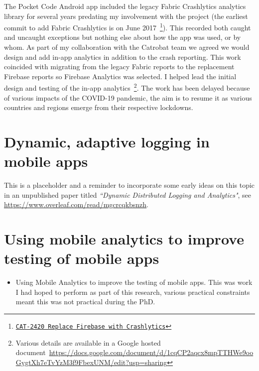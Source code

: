 The Pocket Code Android app included the legacy Fabric Crashlytics analytics library for several years predating my involvement with the project (the earliest commit to add Fabric Crashlytics is on  June 2017~\footnote{\href{https://github.com/Catrobat/Catroid/commit/95aa37ff5263402b41b63f50296aabc8c354433e}{\texttt{CAT-2420 Replace Firebase with Crashlytics}}}). This recorded both caught and uncaught exceptions but nothing else about how the app was used, or by whom. As part of my collaboration with the Catrobat team we agreed we would design and add in-app analytics in addition to the crash reporting. This work coincided with migrating from the legacy Fabric reports to the replacement Firebase reports so Firebase Analytics was selected. I helped lead the initial design and testing of the in-app analytics~\footnote{Various details are available in a Google hosted document~\url{https://docs.google.com/document/d/1cqCP2aqcx8mpTTHWe9ooGygtXh7eTvYzM3f9FbexUNM/edit?usp=sharing}}. The work has been delayed because of various impacts of the COVID-19 pandemic, the aim is to resume it as various countries and regions emerge from their respective lockdowns.


\section{Dynamic, adaptive logging in mobile apps}
This is a placeholder and a reminder to incorporate some early ideas on this topic in an unpublished paper titled \emph{``Dynamic Distributed Logging and Analytics"}, see \url{https://www.overleaf.com/read/mgcrcqkbsnzh}.



\section{Using mobile analytics to improve testing of mobile apps}
\begin{itemize}
    \item Using Mobile Analytics to improve the testing of mobile apps. This was work I had hoped to perform as part of this research, various practical constraints meant this was not practical during the PhD.
\end{itemize}

